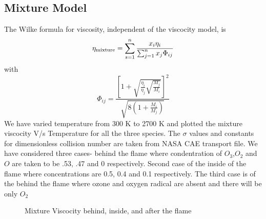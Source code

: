 \subsection{Mixture Model}
\noindent The Wilke formula for viscosity, independent of
the viscocity model, is
\begin{equation}
\eta_{\textnormal{mixture}} = \sum_{s=1}^{n} \frac {x_i \eta_i}{\sum_{j=1}^{n} x_j \Phi_{ij}}
\end{equation}
with
\begin{equation}
\Phi_{ij} = \frac{
                \left[
                     1 + \sqrt{\frac{\eta_i}{\eta_j}\sqrt{\frac{M_j}{M_i}}}
                \right]^2
                }{\sqrt{8\left(1 + \frac{M_i}{M_j}\right)}}
\end{equation}
\noindent  We have varied temperature from 300 K to 2700 K and plotted the mixture viscocity V/s Temperature for all the  three species. The $\sigma$ values and constants for dimensionless collision number are taken from NASA CAE transport file. We have considered three cases-  behind the flame where condentration of $O_3$,$O_2$ and $O$ are taken to be .53, .47 and 0 respectively. Second case of the inside of the flame where concentrations are 0.5, 0.4 and 0.1 respectively. The third case is of the behind the flame where ozone and oxygen radical are absent and there will be only $O_2$




\begin{figure}[H]


    \caption{Mixture Viscocity behind, inside, and after the flame}
\end{figure}


